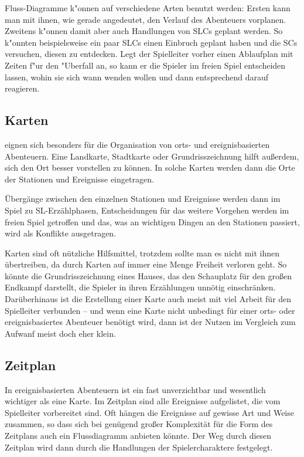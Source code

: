 Fluss-Diagramme k"onnen auf verschiedene Arten benutzt werden: Ersten kann man mit ihnen, wie gerade angedeutet, den Verlauf des Abenteuers vorplanen. Zweitens k"onnen damit aber auch Handlungen von SLCs geplant werden. So k"onnten beispielsweise ein paar SLCs einen Einbruch geplant haben und die SCs versuchen, diesen zu entdecken. Legt der Spielleiter vorher einen Ablaufplan mit Zeiten f"ur den "Uberfall an, so kann er die Spieler im freien Spiel entscheiden lassen, wohin sie sich wann wenden wollen und dann entsprechend darauf reagieren.

\subsection{Karten}
 eignen sich besonders für die Organisation von orts- und ereignisbasierten Abenteuern. Eine Landkarte, Stadtkarte oder Grundrisszeichnung hilft außerdem, sich den Ort besser vorstellen zu können. In solche Karten werden dann die Orte der Stationen und Ereignisse eingetragen.

Übergänge zwischen den einzelnen Stationen und Ereignisse werden dann im Spiel zu SL-Erzählphasen, Entscheidungen für das weitere Vorgehen werden im freien Spiel getroffen und das, was an wichtigen Dingen an den Stationen passiert, wird als Konflikte ausgetragen.

Karten sind oft nützliche Hilfsmittel, trotzdem sollte man es nicht mit ihnen übertreiben, da durch Karten auf immer eine Menge Freiheit verloren geht. So könnte die Grundrisszeichnung eines Hauses, das den Schauplatz für den großen Endkampf darstellt, die Spieler in ihren Erzählungen unnötig einschränken. Darüberhinaus ist die Erstellung einer Karte auch meist mit viel Arbeit für den Spielleiter verbunden -- und wenn eine Karte nicht unbedingt für einer orts- oder ereignisbasiertes Abenteuer benötigt wird, dann ist der Nutzen im Vergleich zum Aufwanf meist doch eher klein.

\subsection{Zeitplan}
In ereignisbasierten Abenteuern ist ein  fast unverzichtbar und wesentlich wichtiger als eine Karte. Im Zeitplan sind alle Ereignisse aufgelistet, die vom Spielleiter vorbereitet sind. Oft hängen die Ereignisse auf gewisse Art und Weise zusammen, so dass sich bei genügend großer Komplexität für die Form des Zeitplans auch ein Flussdiagramm anbieten könnte. Der Weg durch diesen Zeitplan wird dann durch die Handlungen der Spielercharaktere festgelegt.

